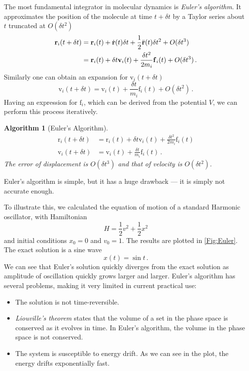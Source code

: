 \documentclass{article}
\theoremstyle{plain}\theoremheaderfont{\normalfont\itshape}\theorembodyfont{\rmfamily}\theoremseparator{.}\newtheorem*{rem}{Remark}\newtheorem*{ex}{Example}\newtheorem*{proof}{Proof}\newtheorem*{altp}{Alternative proof}
\theoremstyle{plain}\theoremheaderfont{\normalfont\bfseries}\theorembodyfont{\rmfamily}\theoremseparator{.}\newtheorem{thm}{Theorem}[section]\newtheorem{lem}[thm]{Lemma}\newtheorem{prop}[thm]{Proposition}\newtheorem*{cor}{Corollary}\newtheorem{defn}[thm]{Definition}\newtheorem{clm}[thm]{Claim}\newtheorem{clminproof}{Claim}\newtheorem{alg}[thm]{Algorithm}\newtheorem{hyp}[thm]{Hypothesis}\newtheorem{law}[thm]{Law}
\theoremstyle{break}\theoremheaderfont{\normalfont\itshape}\theorembodyfont{\rmfamily}\theoremseparator{.\medskip}\newtheorem*{proofskip}{Proof}\newtheorem*{exs}{Examples}\newtheorem*{rems}{Remarks}
\theoremstyle{break}\theoremheaderfont{\normalfont\bfseries}\theorembodyfont{\rmfamily}\theoremseparator{.\medskip}\newtheorem{lemskip}[thm]{Lemma}\newtheorem{defnskip}[thm]{Definition}\newtheorem{propskip}[thm]{Proposition}\newtheorem{thmskip}[thm]{Theorem}
\numberwithin{equation}{section}
\newcommand{\vb}[1]{\bm{\mathrm{#1}}}
\begin{document}
    The most fundamental integrator in molecular dynamics is \textit{Euler's algorithm}. It approximates the position of the molecule at time \(t+\delta t\) by a Taylor series about \(t\) truncated at \(O(\delta t^2)\)
    \begin{align}
        \vb{r}_i(t+\delta t)&=\vb{r}_i(t)+\dot{\vb{r}}(t)\delta t+\frac{1}{2}\ddot{\vb{r}}(t)\delta t^2+O(\delta t^3)\notag\\
        &=\vb{r}_i(t)+\delta t\vb{v}_i(t)+\frac{\delta t^2}{2m_i}\vb{f}_i(t)+O(\delta t^3)\,.
    \end{align}
    Similarly one can obtain an expansion for \(\vb{v}_i(t+\delta t)\)
    \begin{equation}
        \vb{v}_i(t+\delta t)=\vb{v}_i(t)+\frac{\delta t}{m_i}\vb{f}_i(t)+O(\delta t^2)\,.
    \end{equation}
    Having an expression for \(\vb{f}_i\), which can be derived from the potential \(V\), we can perform this process iteratively.

    \begin{alg}[Euler's Algorithm]
        \begin{align}
            \vb{r}_i(t+\delta t)&=\vb{r}_i(t)+\delta t\vb{v}_i(t)+\frac{\delta t^2}{2m_i}\vb{f}_i(t)\\
            \vb{v}_i(t+\delta t)&=\vb{v}_i(t)+\frac{\delta t}{m_i}\vb{f}_i(t)\,.
        \end{align}
        The error of displacement is \(O(\delta t^3)\) and that of velocity is \(O(\delta t^2)\).
    \end{alg}

    Euler's algorithm is simple, but it has a huge drawback --- it is simply not accurate enough.

    To illustrate this, we calculated the equation of motion of a standard Harmonic oscillator, with Hamiltonian
    \begin{equation}
        H=\frac{1}{2}v^2+\frac{1}{2}x^2
    \end{equation}
    and initial conditions \(x_0=0\) and \(v_0=1\). The results are plotted in \cref{Fig:Euler}. The exact solution is a sine wave
    \begin{equation}
        x(t)=\sin t\,.
    \end{equation}
    We can see that Euler's solution quickly diverges from the exact solution as amplitude of oscillation quickly grows larger and larger. Euler's algorithm has several problems, making it very limited in current practical use:
    \begin{itemize}[topsep=0pt]
        \item The solution is not time-reversible.
        \item \textit{Liouville's theorem} states that the volume of a set in the phase space is conserved as it evolves in time. In Euler's algorithm, the volume in the phase space is not conserved. 
        \item The system is susceptible to energy drift. As we can see in the plot, the energy drifts exponentially fast.
    \end{itemize}
\end{document}
